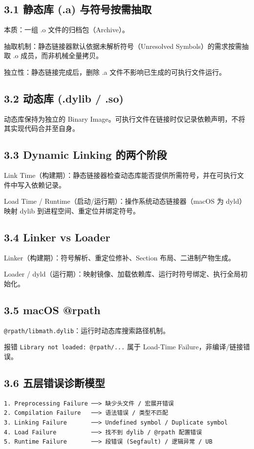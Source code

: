 \documentclass[11pt,a4paper]{article}
\begin{document}
\subsection{3.1 静态库 (.a) 与符号按需抽取}
本质：一组 .o 文件的归档包（Archive）。

抽取机制：静态链接器默认依据未解析符号（Unresolved Symbols）的需求按需抽取 .o 成员，而非机械全量拷贝。

独立性：静态链接完成后，删除 .a 文件不影响已生成的可执行文件运行。

\subsection{3.2 动态库 (.dylib / .so)}
动态库保持为独立的 Binary Image。可执行文件在链接时仅记录依赖声明，不将其实现代码合并至自身。

\subsection{3.3 Dynamic Linking 的两个阶段}
Link Time（构建期）：静态链接器检查动态库能否提供所需符号，并在可执行文件中写入依赖记录。

Load Time / Runtime（启动/运行期）：操作系统动态链接器（macOS 为 dyld）映射 dylib 到进程空间、重定位并绑定符号。

\subsection{3.4 Linker vs Loader}
Linker（构建期）：符号解析、重定位修补、Section 布局、二进制产物生成。

Loader / dyld（运行期）：映射镜像、加载依赖库、运行时符号绑定、执行全局初始化。

\subsection{3.5 macOS @rpath}
\texttt{@rpath/libmath.dylib}：运行时动态库搜索路径机制。

报错 \texttt{Library not loaded: @rpath/...} 属于 Load-Time Failure，非编译/链接错误。

\subsection{3.6 五层错误诊断模型}
\begin{lstlisting}[language=text]
1. Preprocessing Failure ──> 缺少头文件 / 宏展开错误
2. Compilation Failure   ──> 语法错误 / 类型不匹配
3. Linking Failure       ──> Undefined symbol / Duplicate symbol
4. Load Failure          ──> 找不到 dylib / @rpath 配置错误
5. Runtime Failure       ──> 段错误 (Segfault) / 逻辑异常 / UB
\end{lstlisting}
\end{document}
